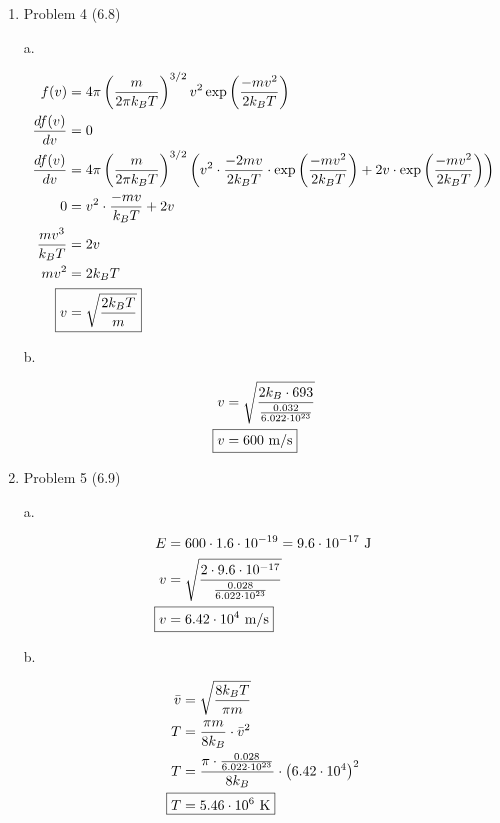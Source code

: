 \documentclass[12pt]{article}
\begin{document}
\begin{enumerate}
    \begin{align*}
        P &= \frac{nk_BT}{V} \\
        P &= \frac{1 \cdot k_B \cdot 300}{\left(20\cdot10^{-10}\right)^3} \\
        \Aboxed{P &= 5.19\cdot10^5 \text{ Pa}}
    \end{align*}
    
    \newpage
    \item Problem 4 (6.8)
    
    a.

    \begin{align*}
        f(v) &= 4\pi \left(\frac{m}{2\pi k_BT}\right)^{3/2}v^2 \exp\left(\frac{-mv^2}{2k_BT}\right) \\
        \frac{df(v)}{dv} &= 0 \\
        \frac{df(v)}{dv} &= 4\pi \left(\frac{m}{2\pi k_BT}\right)^{3/2} \left(v^2\cdot\frac{-2mv}{2k_BT}\cdot\exp\left(\frac{-mv^2}{2k_BT}\right) + 2v\cdot\exp\left(\frac{-mv^2}{2k_BT}\right)\right) \\
        0 &= v^2\cdot\frac{-mv}{k_BT} + 2v \\
        \frac{mv^3}{k_BT} &= 2v \\
        mv^2 &= 2k_BT \\
        \Aboxed{v &= \sqrt{\frac{2k_BT}{m}}}
    \end{align*}

    b.

    \begin{align*}
        v &= \sqrt{\frac{2k_B\cdot693}{\frac{0.032}{6.022\cdot10^{23}}}} \\
        \Aboxed{v &= 600 \text{ m/s}}
    \end{align*}
    
    \newpage
    \item Problem 5 (6.9)
    
    a.

    \begin{align*}
        E &= 600 \cdot 1.6\cdot10^{-19} = 9.6\cdot10^{-17} \text{ J} \\
        v &= \sqrt{\frac{2\cdot9.6\cdot10^{-17}}{\frac{0.028}{6.022\cdot10^{23}}}} \\
        \Aboxed{v &= 6.42\cdot10^4 \text{ m/s}}
    \end{align*}

    b.

    \begin{align*}
        \bar{v} &= \sqrt{\frac{8k_BT}{\pi m}} \\
        T &= \frac{\pi m}{8k_B} \cdot\bar{v}^2 \\
        T &= \frac{\pi \cdot\frac{0.028}{6.022\cdot10^{23}}}{8k_B} \cdot \left(6.42\cdot10^4\right)^2 \\
        \Aboxed{T &= 5.46\cdot10^6 \text{ K}}
    \end{align*}
    

\end{enumerate}
\end{document}

